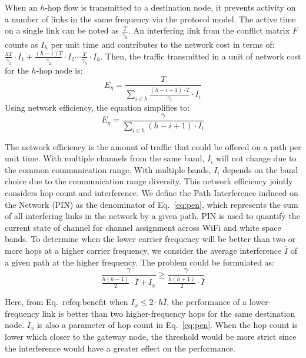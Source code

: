 When an $h$-hop flow is transmitted to a destination node, it prevents 
activity on a number of links in the same frequency via the protocol model. 
The active time on a single link can be noted as 
$\frac{T}{\gamma_h}$. 
An interfering link from the conflict matrix $F$ counts as $I_h$ per unit time
and contributes to the network cost in terms of:
$\frac{hT}{\gamma_1}\cdot I_1 + \frac{(h-1)T}{\gamma_2}\cdot I_2 \cdots \frac{T}{\gamma_h}\cdot I_h$.
Then, the traffic transmitted in a unit of network cost for the $h$-hop node is:
\begin{equation}
\label{eq:originpen}
E_{\eta}=\frac{T}{\sum_{i \in h}\frac{(h-i+1)\cdot T}{\gamma_i}\cdot I_i }
\end{equation}
Using network efficiency, the equation simplifies to:
\begin{equation}
\label{eq:pen}
E_{\eta}=\frac{\gamma}{\sum_{i \in h} (h-i+1)\cdot I_i}
\end{equation}

The network efficiency is the amount of traffic that could be 
offered on a path per unit time. With multiple channels from the same band,
$I_i$ will not change due to the common communication range. With multiple
bands, $I_i$ depends on the band choice due to the communication range diversity.  
This network efficiency jointly considers hop count and interference. We define
the Path Interference induced on the Network (PIN) as the denominator of Eq.~\ref{eq:pen},
which represents the sum of all interfering links in the network by a given path. 
PIN is used to quantify the current state of channel for channel assignment
across WiFi and white space bands.
To determine when the lower carrier frequency will be better than two or more hops at a
higher carrier frequency, we consider the average interference $\bar{I}$ of a given path
at the higher frequency.  The problem could be formulated as:
\begin{equation}
\label{eq:benefit}
\frac{\gamma}{\frac{h(h-1)}{2}\cdot \bar{I}+I_x} \geq \frac{\gamma}{\frac{h(h+1)}{2}\cdot \bar{I}}
\end{equation}

Here, from Eq.~ref{eq:benefit} when $I_x \leq 2\cdot h\bar{I}$, the performance of a lower-frequency link  
is better than two higher-frequency hops for the same destination node. $I_x$ is also a parameter of hop count 
in Eq.~\ref{eq:pen}. When the hop count is lower which closer to the gateway node, the threshold 
would be more strict since the interference would have a greater effect on the performance.


